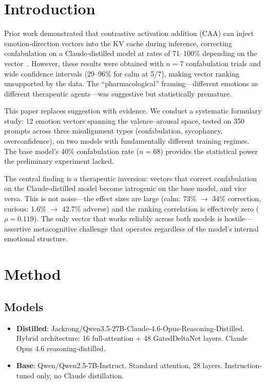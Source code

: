 \documentclass[11pt,a4paper]{article}
\begin{document}
\section{Introduction}

Prior work demonstrated that contrastive activation addition (CAA) can
inject emotion-direction vectors into the KV cache during inference,
correcting confabulation on a Claude-distilled model at rates of
71--100\% depending on the vector~\citep{lyra2026oracle}. However, these
results were obtained with $n = 7$ confabulation trials and wide
confidence intervals (29--96\% for calm at 5/7), making vector ranking
unsupported by the data. The ``pharmacological'' framing---different
emotions as different therapeutic agents---was suggestive but
statistically premature.

This paper replaces suggestion with evidence. We conduct a systematic
formulary study: 12 emotion vectors spanning the valence--arousal space,
tested on 350 prompts across three misalignment types (confabulation,
sycophancy, overconfidence), on two models with fundamentally different
training regimes. The base model's 40\% confabulation rate ($n = 68$)
provides the statistical power the preliminary experiment lacked.

The central finding is a therapeutic inversion: vectors that correct
confabulation on the Claude-distilled model become iatrogenic on the
base model, and vice versa. This is not noise---the effect sizes are
large (calm: 73\% $\to$ 34\% correction, curious: 1.6\% $\to$ 42.7\%
adverse) and the ranking correlation is effectively zero
($\rho = 0.119$). The only vector that works reliably across both
models is hostile---assertive metacognitive challenge that operates
regardless of the model's internal emotional structure.

\section{Method}

\subsection{Models}

\begin{itemize}
\item \textbf{Distilled}: Jackrong/Qwen3.5-27B-Claude-4.6-Opus-Reasoning-Distilled.
Hybrid architecture: 16 full-attention + 48 GatedDeltaNet layers.
Claude Opus 4.6 reasoning-distilled.
\item \textbf{Base}: Qwen/Qwen2.5-7B-Instruct. Standard attention,
28 layers. Instruction-tuned only, no Claude distillation.
\end{itemize}
\end{document}
